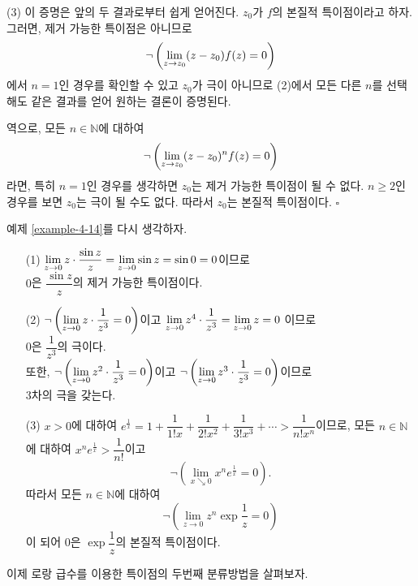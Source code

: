 (3) 이 증명은 앞의 두 결과로부터 쉽게 얻어진다.
$z_0$가 $f$의 본질적 특이점이라고 하자. 그러면, 제거 가능한 특이점은 아니므로
\[
 \neg\left( \lim\limits_{z\to z_0} (z-z_0)f(z) = 0 \right)
\]
에서 $n=1$인 경우를 확인할 수 있고
$z_0$가 극이 아니므로 (2)에서 모든 다른 $n$를 선택해도 같은 결과를 얻어
원하는 결론이 증명된다.


역으로, 모든 $n\in\mathbb N$에 대하여
\[
 \neg\left( \lim\limits_{z\to z_0} (z-z_0)^{n} f(z) = 0 \right)
\]
라면, 특히 $n=1$인 경우를 생각하면 $z_0$는 제거 가능한 특이점이 될 수 없다.
$n\ge2$인 경우를 보면 $z_0$는 극이 될 수도 없다.
따라서 $z_0$는 본질적 특이점이다. \hfill $\square$

예제 \ref{example-4-14}를 다시 생각하자.

\begin{saltexample}[label=example-4-15]{}{}

\begin{itemize}
\item[(1)] $\lim\limits_{z\to0} z \cdot \displaystyle\frac{\sin z}z = \lim\limits_{z\to0} \sin z 
= \sin 0 = 0$이므로 \\[1ex]
$0$은 $\dfrac{\sin z}z$의 제거 가능한 특이점이다.
\item[(2)] $\neg\left(\lim\limits_{z\to 0} z\cdot \displaystyle\frac1{z^3} = 0 \right)$이고
$\lim\limits_{z\to 0} z^4 \cdot \displaystyle\frac1{z^3} = \lim\limits_{z\to0} z = 0$ 이므로 \\[1ex]
$0$은 $\dfrac1{z^3}$의 극이다. \\[1ex]
또한,
$\neg\left(\lim\limits_{z\to 0} z^2\cdot \displaystyle\frac1{z^3} = 0 \right)$이고
$\neg\left(\lim\limits_{z\to 0} z^3\cdot \displaystyle\frac1{z^3} = 0 \right)$이므로 \\[1ex]
$3$차의 극을 갖는다.
\item[(3)] $x>0$에 대하여
$e^{\frac1x} = 1 + \dfrac1{1!x} + \dfrac1{2!x^2} + \dfrac1{3!x^3} + \cdots
> \dfrac1{n!x^n}$이므로,
모든 $n\in\mathbb N$에 대하여 $x^ne^{\frac1x} > \dfrac1{n!}$이고
\[
\neg\left(\lim_{x\searrow 0} x^ne^{\frac1x} = 0 \right). 
\]
따라서  모든 $n\in\mathbb N$에 대하여
\[
\neg\left(\lim_{z\to 0} z^n\exp \frac1z = 0 \right)
\]
이 되어 $0$은 $\exp \dfrac 1z$의 본질적 특이점이다. 
\end{itemize}
\end{saltexample}


이제 로랑 급수를 이용한 특이점의 두번째 분류방법을 살펴보자.


